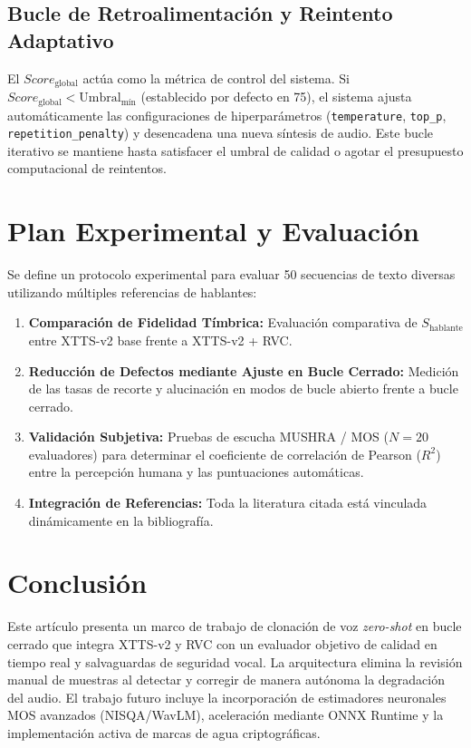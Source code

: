 \documentclass[conference]{IEEEtran}
\begin{document}
\subsection{Bucle de Retroalimentación y Reintento Adaptativo}
El $Score_{\text{global}}$ actúa como la métrica de control del sistema. Si $Score_{\text{global}} < \text{Umbral}_{\text{mín}}$ (establecido por defecto en 75), el sistema ajusta automáticamente las configuraciones de hiperparámetros (\texttt{temperature}, \texttt{top\_p}, \texttt{repetition\_penalty}) y desencadena una nueva síntesis de audio. Este bucle iterativo se mantiene hasta satisfacer el umbral de calidad o agotar el presupuesto computacional de reintentos.






\section{Plan Experimental y Evaluación}
Se define un protocolo experimental para evaluar 50 secuencias de texto diversas utilizando múltiples referencias de hablantes:
\begin{enumerate}
    \item \textbf{Comparación de Fidelidad Tímbrica:} Evaluación comparativa de $S_{\text{hablante}}$ entre XTTS-v2 base frente a XTTS-v2 + RVC.
    \item \textbf{Reducción de Defectos mediante Ajuste en Bucle Cerrado:} Medición de las tasas de recorte y alucinación en modos de bucle abierto frente a bucle cerrado.
    \item \textbf{Validación Subjetiva:} Pruebas de escucha MUSHRA / MOS ($N=20$ evaluadores) para determinar el coeficiente de correlación de Pearson ($R^2$) entre la percepción humana y las puntuaciones automáticas.
    \item \textbf{Integración de Referencias:} Toda la literatura citada \cite{casanova2024xtts, rvc2023, mittag2021nisqa, shen2018natural, softness2023contentvec} está vinculada dinámicamente en la bibliografía.
\end{enumerate}

\section{Conclusión}
Este artículo presenta un marco de trabajo de clonación de voz \emph{zero-shot} en bucle cerrado que integra XTTS-v2 y RVC con un evaluador objetivo de calidad en tiempo real y salvaguardas de seguridad vocal. La arquitectura elimina la revisión manual de muestras al detectar y corregir de manera autónoma la degradación del audio. El trabajo futuro incluye la incorporación de estimadores neuronales MOS avanzados (NISQA/WavLM), aceleración mediante ONNX Runtime y la implementación activa de marcas de agua criptográficas.



\end{document}
